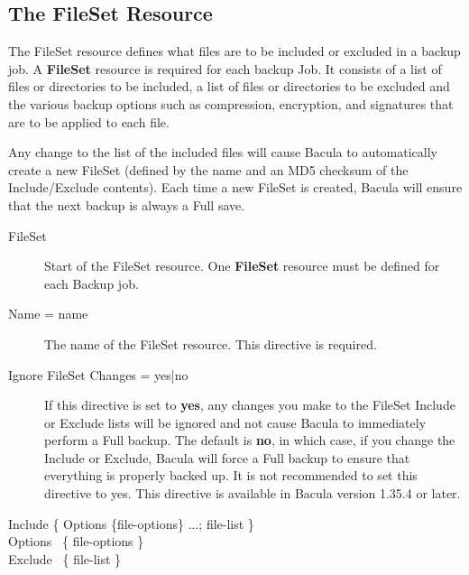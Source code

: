 
\subsection*{The FileSet Resource}
\label{FileSetResource}

The FileSet resource defines what files are to be included or excluded in a
backup job.  A {\bf FileSet} resource is required for each backup Job.  It
consists of a list of files or directories to be included, a list of files
or directories to be excluded and the various backup options such as
compression, encryption, and signatures that are to be applied to each
file.

Any change to the list of the included files will cause Bacula to
automatically create a new FileSet (defined by the name and an MD5 checksum
of the Include/Exclude contents).  Each time a new FileSet is created,
Bacula will ensure that the next backup is always a Full save.

\begin{description}

\item [FileSet]
Start of the FileSet resource. One {\bf FileSet}  resource must be
defined for each Backup job.

\item [Name = \lt{}name\gt{}]
The name of the FileSet resource.  This directive is required. 

\item [Ignore FileSet Changes = \lt{}yes|no\gt{}]
   If this directive is set to {\bf yes}, any changes you make to the  FileSet
   Include or Exclude lists will be ignored and not cause Bacula  to immediately
   perform a Full backup. The default is {\bf no}, in which  case, if you change
   the Include or Exclude, Bacula will force a Full  backup to ensure that
   everything is properly backed up. It is not recommended  to set this directive
   to yes. This directive is available in Bacula  version 1.35.4 or later. 

\item [Include \{ Options \{\lt{}file-options\gt{}\} ...;
   \lt{}file-list\gt{} \} ]

\item [Options \ \{ \lt{}file-options\gt{} \} ]

\item [Exclude \ \{ \lt{}file-list\gt{} \}]

\end{description}

